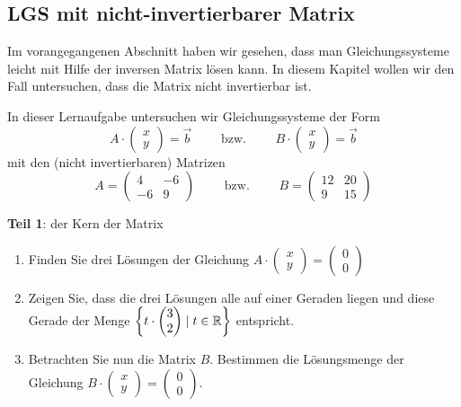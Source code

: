 \subsection{LGS mit nicht-invertierbarer Matrix}

Im vorangegangenen Abschnitt haben wir gesehen, dass man Gleichungssysteme leicht mit Hilfe der inversen Matrix lösen kann. In diesem Kapitel wollen wir den Fall untersuchen, dass die Matrix nicht invertierbar ist. 

\begin{LA}
{}{}
In dieser Lernaufgabe untersuchen wir Gleichungssysteme der Form
$$ A\cdot \begin{pmatrix}
    x\\y
\end{pmatrix}= \vec{b} \qquad \text{ bzw. } \qquad B\cdot \begin{pmatrix}
    x\\y
\end{pmatrix}= \vec{b}$$
mit den (nicht invertierbaren) Matrizen
$$ A = \begin{pmatrix}
    4 & -6\\
    -6 & 9
\end{pmatrix} \qquad \text{ bzw. } \qquad B = \begin{pmatrix}
    12 & 20\\
    9 & 15
\end{pmatrix}$$


\textbf{Teil 1}: der Kern der Matrix

\begin{enumerate}
    \item Finden Sie drei Lösungen der Gleichung $A\cdot \begin{pmatrix}
    x\\y
\end{pmatrix}= \begin{pmatrix}
    0\\0
\end{pmatrix}$
\item Zeigen Sie, dass die drei Lösungen alle auf einer Geraden liegen und diese Gerade der Menge $\left\{t\cdot \begin{pmatrix}
    3\\2
\end{pmatrix} \mid t \in \mathbb{R}\right\}$ entspricht.
\item Betrachten Sie nun die Matrix $B$. Bestimmen die Lösungsmenge der Gleichung $B\cdot \begin{pmatrix}
    x\\y
\end{pmatrix}= \begin{pmatrix}
    0\\0
\end{pmatrix}$.
\end{enumerate}


\end{LA}

